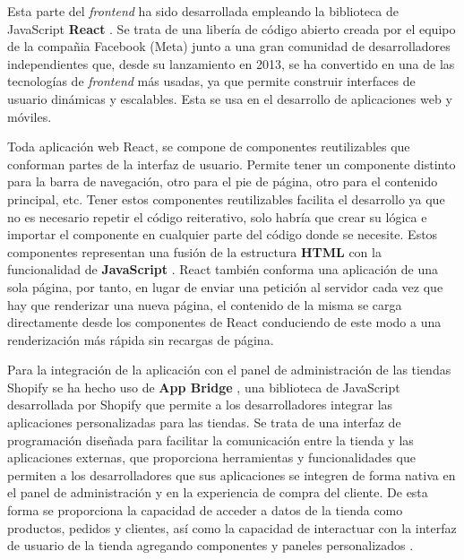 \documentclass[11pt]{article}
\begin{document}
Esta parte del \textit{frontend} ha sido desarrollada empleando la biblioteca de JavaScript \textbf{React} \cite{react-pag-1}. Se trata de una libería de código abierto creada por el equipo de la
compañia Facebook (Meta) junto a una gran comunidad de desarrolladores independientes que, desde su lanzamiento en 2013, se ha convertido en una
de las tecnologías de \textit{frontend} más usadas, ya que permite construir interfaces de usuario dinámicas y escalables. Esta se usa en el desarrollo de aplicaciones web y móviles. 

Toda aplicación web React, se compone de componentes reutilizables que conforman partes de la interfaz de usuario. Permite tener un componente distinto para
la barra de navegación, otro para el pie de página, otro para el contenido principal, etc.
Tener estos componentes reutilizables facilita el desarrollo ya que no es necesario repetir el código reiterativo, solo habría que crear su lógica e
importar el componente en cualquier parte del código donde se necesite. Estos componentes representan una fusión de la estructura \textbf{HTML} \cite{html} con la funcionalidad de \textbf{JavaScript} \cite{javascript}.
React también conforma una aplicación de una sola página, por tanto, en lugar de enviar una petición al servidor cada vez que hay que renderizar una nueva página,
el contenido de la misma se carga directamente desde los componentes de React conduciendo de este modo a una renderización más rápida sin recargas de página. \cite{react-pag-2}

Para la integración de la aplicación con el panel de administración de las tiendas Shopify se ha hecho uso de \textbf{App Bridge} \cite{app-bridge}, una biblioteca de JavaScript
desarrollada por Shopify que permite a los desarrolladores integrar las aplicaciones personalizadas para las tiendas. Se trata de una interfaz
de programación diseñada para facilitar la comunicación entre la tienda y las aplicaciones externas, que proporciona herramientas y funcionalidades
que permiten a los desarrolladores que sus aplicaciones se integren de forma nativa en el panel de administración y en la experiencia de compra
del cliente. De esta forma se proporciona la capacidad de acceder a datos de la tienda como productos, pedidos y clientes, así como la capacidad de interactuar con la interfaz
de usuario de la tienda agregando componentes y paneles personalizados \cite{shopify-dev}. 
\end{document}
